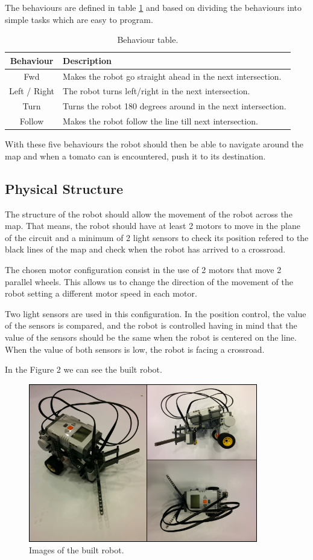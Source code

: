 \documentclass[12pt,a4paper]{article}
\begin{document}
The behaviours are defined in table \ref{tab:behaviourExplained} and based on dividing the behaviours into simple tasks which are easy to program.

\begin{table}[H]
\center
\begin{tabular}{c|l}
Behaviour & Description \\ \hline
Fwd & Makes the robot go straight ahead in the next intersection. \\
Left / Right & The robot turns left/right in the next intersection. \\
Turn & Turns the robot 180 degrees around in the next intersection. \\
Follow & Makes the robot follow the line till next intersection.
\end{tabular}
\caption{Behaviour table.}
\label{tab:behaviourExplained}
\end{table}

With these five behaviours the robot should then be able to navigate around the map and when a tomato can is encountered, push it to its destination.

\subsection{Physical Structure}
The structure of the robot should allow the movement of the robot across the map. That means, the robot should have at least 2 motors to move in the plane of the circuit and a minimum of 2 light sensors to check its position refered to the black lines of the map and check when the robot has arrived to a crossroad.

The chosen motor configuration consist in the use of 2 motors that move 2 parallel wheels. This allows us to change the direction of the movement of the robot setting a different motor speed in each motor.

Two light sensors are used in this configuration. In the position control, the value of the sensors is compared, and the robot is controlled having in mind that the value of the sensors should be the same when the robot is centered on the line.
When the value of both sensors is low, the robot is facing a crossroad.

In the Figure 2 we can see the built robot.

\begin{figure}[h]
\includegraphics[width=10cm]{Fig1.png}
\centering
\caption{Images of the built robot.}
\end{figure}
\end{document}
